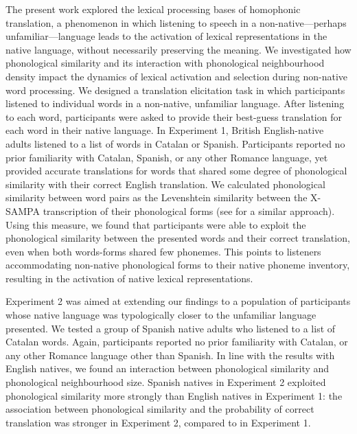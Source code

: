 \documentclass[
]{article}
\begin{document}
The present work explored the lexical processing bases of homophonic
translation, a phenomenon in which listening to speech in a
non-native---perhaps unfamiliar---language leads to the activation of
lexical representations in the native language, without necessarily
preserving the meaning. We investigated how phonological similarity and
its interaction with phonological neighbourhood density impact the
dynamics of lexical activation and selection during non-native word
processing. We designed a translation elicitation task in which
participants listened to individual words in a non-native, unfamiliar
language. After listening to each word, participants were asked to
provide their best-guess translation for each word in their native
language. In Experiment 1, British English-native adults listened to a
list of words in Catalan or Spanish. Participants reported no prior
familiarity with Catalan, Spanish, or any other Romance language, yet
provided accurate translations for words that shared some degree of
phonological similarity with their correct English translation. We
calculated phonological similarity between word pairs as the Levenshtein
similarity between the X-SAMPA transcription of their phonological forms
(see  for a
similar approach). Using this measure, we found that participants were
able to exploit the phonological similarity between the presented words
and their correct translation, even when both words-forms shared few
phonemes. This points to listeners accommodating non-native phonological
forms to their native phoneme inventory, resulting in the activation of
native lexical representations.

Experiment 2 was aimed at extending our findings to a population of
participants whose native language was typologically closer to the
unfamiliar language presented. We tested a group of Spanish native
adults who listened to a list of Catalan words. Again, participants
reported no prior familiarity with Catalan, or any other Romance
language other than Spanish. In line with the results with English
natives, we found an interaction between phonological similarity and
phonological neighbourhood size. Spanish natives in Experiment 2
exploited phonological similarity more strongly than English natives in
Experiment 1: the association between phonological similarity and the
probability of correct translation was stronger in Experiment 2,
compared to in Experiment 1.
\end{document}

